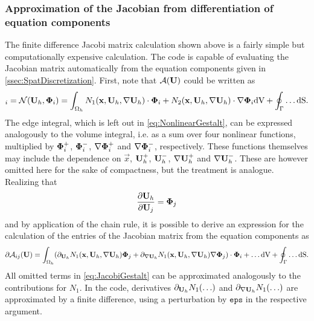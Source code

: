 \subsubsection{Approximation of the Jacobian from differentiation of equation components}
The finite difference Jacobi matrix calculation shown above is a fairly simple but computationally expensive calculation. The \BoSSS code is capable of evaluating the Jacobian matrix automatically from the equation components given in \cref{ssec:SpatDiscretization}.
First, note that $\mathcal{A}(\textbf{U})$ could be written as
\begin{equation}
	[\mathcal{A}(\myvector{U})]_i = \mathcal{N}( \myvector{U}_h , \gvec{\Phi}_i) =
	\int_{\Omega_h}
	N_1 (\vec{x}, \myvector{U}_h , \nabla \myvector{U}_h  ) \cdot \gvec{\Phi}_i
	+ N_2 (\vec{x}, \myvector{U}_h , \nabla \myvector{U}_h  ) \cdot \nabla \gvec{\Phi}_i
	\textrm{dV}
	+
	\oint_{\Gamma} \ldots \mathrm{dS}.
	\label{eq:NonlinearGestalt}
\end{equation}
The edge integral, which is left out in \cref{eq:NonlinearGestalt},
can be expressed analogously to the volume integral, i.e. as a sum over
four nonlinear functions, multiplied by
$ \boldsymbol{\Phi}_i^{+}$,  $\boldsymbol{\Phi}_i^{-}$, $ \nabla \boldsymbol{\Phi}_i^{+}$ and  $ \nabla \boldsymbol{\Phi}_i^{-}$,
respectively.
These functions themselves may include the dependence on
$\vec{x}$, $\textbf{U}_h^{+}$,  $\textbf{U}_h^{-}$, $\nabla \textbf{U}_h^{+}$ and  $\nabla \textbf{U}_h^{-}$.
These are however omitted here for the sake of compactness, but the treatment is analogue. Realizing that 
\begin{equation}
	\frac{\partial \textbf{U}_h}{\partial \textbf{U}_j}  = \boldsymbol{\Phi}_j
\end{equation}
and by application of the chain rule, it is possible to derive an expression for the calculation of the entries of the Jacobian matrix from the equation components as
\begin{equation}
	\partial \mathcal{A}_{ij}(\textbf{U}) =
	\int_{\Omega_h}
	( \partial_{ \textbf{U}_h}       N_1 (\textbf{x}, \textbf{U}_h , \nabla \textbf{U}_h  ) \boldsymbol{\Phi}_j
	+   \partial_{\nabla \textbf{U}_h} N_1 (\textbf{x}, \textbf{U}_h , \nabla \textbf{U}_h  ) \nabla \boldsymbol{\Phi}_j ) \cdot \boldsymbol{\Phi}_i
	+ \ldots
	\textrm{dV}
	+
	\oint_{\Gamma} \ldots \mathrm{dS} .
	\label{eq:JacobiGestalt}
\end{equation}
All omitted  terms in \cref{eq:JacobiGestalt} can be approximated analogously to the contributions for $N_1$. In the \BoSSS code, derivatives $ \partial_{ \textbf{U}_h} N_1 ( \ldots )$ and  $ \partial_{ \nabla \textbf{U}_h} N_1 ( \ldots )$ are approximated by a finite difference, using a perturbation by $\mathtt{eps}$ in the respective argument.

